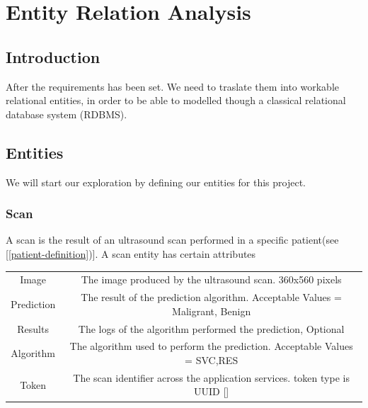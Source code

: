 \chapter{Entity Relation Analysis}
	\section{Introduction}
		After the requirements has been set. We need to traslate them into workable relational entities, in order to be able to modelled though a classical
		relational database system (RDBMS).
	\section{Entities}
		We will start our exploration by defining our entities for this project.
		\subsection{Scan}
		A scan is the result of an ultrasound scan performed in a specific patient(see [\ref{patient-definition})]. A scan entity has certain attributes
		\begin{center}
			\begin{tabular}{ |c|c| } 
				\hline
				Image & The image produced by the ultrasound scan. 360x560 pixels\\
				Prediction & The result of the prediction algorithm. Acceptable Values = {Maligrant, Benign}  \\
				Results & The logs of the algorithm performed the prediction, Optional \\
				Algorithm & The algorithm used to perform the prediction. Acceptable Values = {SVC,RES} \\
				Token& The scan identifier across the application services. token type is UUID [\cite{rfc4122}] \\
				\hline
			\end{tabular}
		\end{center}
